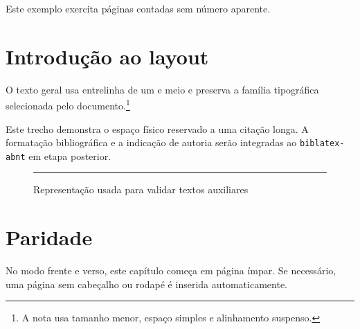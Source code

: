 \documentclass[12pt]{book}
\begin{document}
\ABNTEXpretextualpages


Este exemplo exercita páginas contadas sem número aparente.

\ABNTEXsumario

\ABNTEXtextualpages

\chapter{Introdução ao layout}

O texto geral usa entrelinha de um e meio e preserva a família tipográfica
selecionada pelo documento.\footnote{A nota usa tamanho menor, espaço simples
e alinhamento suspenso.}

\begin{ABNTEXcitacaolonga}
Este trecho demonstra o espaço físico reservado a uma citação longa. A
formatação bibliográfica e a indicação de autoria serão integradas ao
\texttt{biblatex-abnt} em etapa posterior.
\end{ABNTEXcitacaolonga}

\begin{figure}[ht]
  \centering
  \rule{6cm}{3cm}
  \caption{Representação usada para validar textos auxiliares}
\end{figure}

\chapter{Paridade}

No modo frente e verso, este capítulo começa em página ímpar. Se necessário,
uma página sem cabeçalho ou rodapé é inserida automaticamente.
\end{document}
